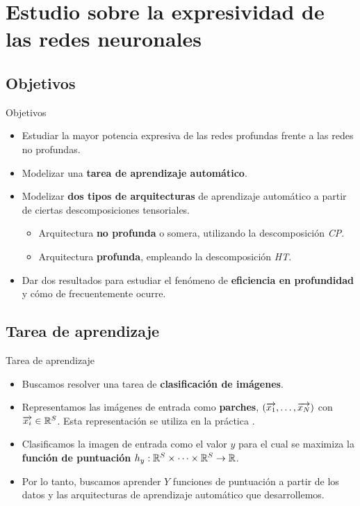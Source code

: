 \section{Estudio sobre la expresividad de las redes neuronales}

\subsection{Objetivos}
\begin{frame}{Objetivos}
	\begin{itemize}
		\item Estudiar la mayor potencia expresiva de las redes profundas frente a las redes no profundas.
		\item Modelizar una \textbf{tarea de aprendizaje automático}.
		\item Modelizar \textbf{dos tipos de arquitecturas} de aprendizaje automático a partir de ciertas descomposiciones tensoriales.
		      \begin{itemize}
			      \item Arquitectura \textbf{no profunda} o somera, utilizando la descomposición \textit{CP}.
			      \item Arquitectura \textbf{profunda}, empleando la descomposición \textit{HT}.
		      \end{itemize}
		\item Dar dos resultados para estudiar el fenómeno de \textbf{eficiencia en profundidad} y cómo de frecuentemente ocurre.
	\end{itemize}
\end{frame}

\subsection{Tarea de aprendizaje}
\begin{frame}{Tarea de aprendizaje}

	\begin{itemize}
		\item Buscamos resolver una tarea de \textbf{clasificación de imágenes}.
		\item Representamos las imágenes de entrada como \textbf{parches}, $(\overrightarrow{x_1}, \ldots, \overrightarrow{x_N})$ con $\overrightarrow{x_i} \in \mathbb{R}^S$. Esta representación se utiliza en la práctica .
		\item Clasificamos la imagen de entrada como el valor $y$ para el cual se maximiza la \textbf{función de puntuación} $h_y: \mathbb{R}^S \times \cdots \times \mathbb{R}^S \to \mathbb{R}$.
		\item Por lo tanto, buscamos aprender $Y$ funciones de puntuación a partir de los datos y las arquitecturas de aprendizaje automático que desarrollemos.
	\end{itemize}

\end{frame}

